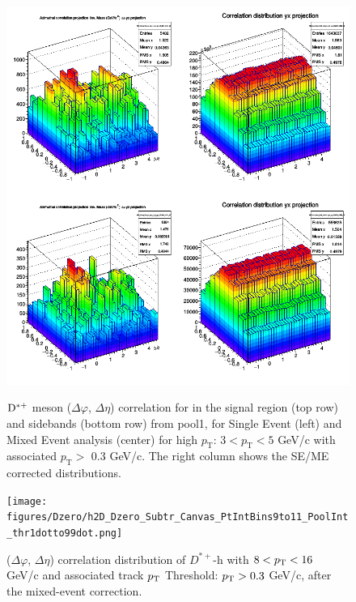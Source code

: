 \begin{figure}
\centering
{\includegraphics[width=1\linewidth]{figures/Dzero/InputCorr_Dzero_Canvas_pool1_pTbin4_thr03to99.png}}
 \caption{${\rm D^{*+}}$ meson ($\Delta\varphi$, $ \Delta\eta$) correlation for in the signal region (top row) and sidebands (bottom row) from pool1, for Single Event (left) and Mixed Event analysis (center) for high $p_\mathrm{T}$: $3 < p_\mathrm{T}<5$ GeV/c with associated $p_\mathrm{T} >$ 0.3 GeV/c. The right column shows the SE/ME corrected distributions.}
\label{fig:DStarME}
\end{figure}

\begin{figure}
\centering
{\texttt{[image: figures/Dzero/h2D\_Dzero\_Subtr\_Canvas\_PtIntBins9to11\_PoolInt\_thr1dotto99dot.png]}}
\caption{($\Delta\varphi$, $\Delta\eta$) correlation distribution of $D^{*+}$-h with $8 < p_{\rm T} < 16$ GeV/c and associated track $p_{\rm T}$ Threshold: $p_{\rm T} > 0.3$ GeV/c, after the mixed-event correction.}
\label{fig:Dsubtr2D}
\end{figure}
\clearpage
%


